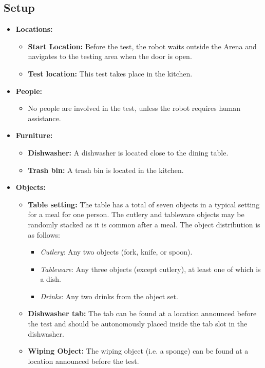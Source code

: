 \subsection*{Setup}
\begin{itemize}[nosep]
	\item \textbf{Locations:}
		\begin{itemize}
			\item \textbf{Start Location:} Before the test, the robot waits outside the Arena and navigates to the testing area when the door is open.
			\item \textbf{Test location:} This test takes place in the kitchen.
		\end{itemize}
	\item \textbf{People:}
		\begin{itemize}
			\item No people are involved in the test, unless the robot requires human assistance.
		\end{itemize}
	\item \textbf{Furniture:}
		\begin{itemize}
			\item \textbf{Dishwasher:} A dishwasher is located close to the dining table.
			\item \textbf{Trash bin:} A trash bin is located in the kitchen.
		\end{itemize}
	\item \textbf{Objects:}
		\begin{itemize}
			\item \textbf{Table setting:} The table has a total of seven objects in a typical setting for a meal for one person. The cutlery and tableware objects may be randomly stacked as it is common after a meal. 
			The object distribution is as follows:
			\begin{itemize}[nosep]
				\item\textit{Cutlery}: Any two objects (fork, knife, or spoon).
				\item\textit{Tableware}: Any three objects (except cutlery), at least one of which is a dish.
				\item\textit{Drinks}: Any two drinks from the object set.
			\end{itemize}
			\item \textbf{Dishwasher tab:} The tab can be found at a location announced before the test and should be autonomously placed inside the tab slot in the dishwasher.
			\item \textbf{Wiping Object:} The wiping object (i.e. a sponge) can be found at a location announced before the test.
		\end{itemize}
\end{itemize}



